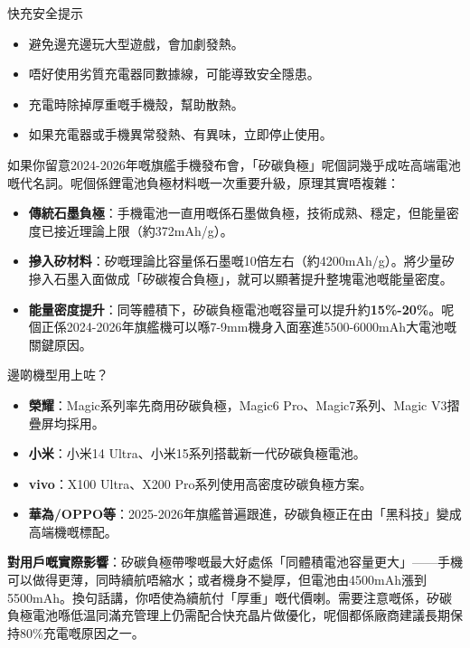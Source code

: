 \begin{tcbwarn}{快充安全提示}
\begin{itemize}
  \item 避免邊充邊玩大型遊戲，會加劇發熱。
  \item 唔好使用劣質充電器同數據線，可能導致安全隱患。
  \item 充電時除掉厚重嘅手機殼，幫助散熱。
  \item 如果充電器或手機異常發熱、有異味，立即停止使用。
\end{itemize}

\end{tcbwarn}


如果你留意2024-2026年嘅旗艦手機發布會，「矽碳負極」呢個詞幾乎成咗高端電池嘅代名詞。呢個係鋰電池負極材料嘅一次重要升級，原理其實唔複雜：

\begin{itemize}
  \item \textbf{傳統石墨負極}：手機電池一直用嘅係石墨做負極，技術成熟、穩定，但能量密度已接近理論上限（約372mAh/g）。
  \item \textbf{摻入矽材料}：矽嘅理論比容量係石墨嘅10倍左右（約4200mAh/g）。將少量矽摻入石墨入面做成「矽碳複合負極」，就可以顯著提升整塊電池嘅能量密度。
  \item \textbf{能量密度提升}：同等體積下，矽碳負極電池嘅容量可以提升約\textbf{15\%-20\%}。呢個正係2024-2026年旗艦機可以喺7-9mm機身入面塞進5500-6000mAh大電池嘅關鍵原因。
\end{itemize}

\begin{tcbinfo}{邊啲機型用上咗？}
\begin{itemize}
  \item \textbf{榮耀}：Magic系列率先商用矽碳負極，Magic6 Pro、Magic7系列、Magic V3摺疊屏均採用。
  \item \textbf{小米}：小米14 Ultra、小米15系列搭載新一代矽碳負極電池。
  \item \textbf{vivo}：X100 Ultra、X200 Pro系列使用高密度矽碳負極方案。
  \item \textbf{華為/OPPO等}：2025-2026年旗艦普遍跟進，矽碳負極正在由「黑科技」變成高端機嘅標配。
\end{itemize}

\end{tcbinfo}

\textbf{對用戶嘅實際影響}：矽碳負極帶嚟嘅最大好處係「同體積電池容量更大」——手機可以做得更薄，同時續航唔縮水；或者機身不變厚，但電池由4500mAh漲到5500mAh。換句話講，你唔使為續航付「厚重」嘅代價喇。需要注意嘅係，矽碳負極電池喺低温同滿充管理上仍需配合快充晶片做優化，呢個都係廠商建議長期保持80\%充電嘅原因之一。

